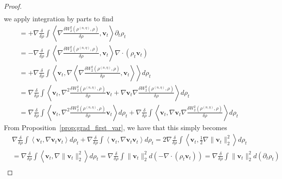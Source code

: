 \documentclass[reqno,11pt,letterpaper]{amsart}
\theoremstyle{plain}
\theoremstyle{definition}
\theoremstyle{remark}
\begin{document}
\begin{proof}
\begin{align*}
\end{align*}
we apply integration by parts to find
\begin{align*}
    &= +\nabla\frac{\delta}{\delta\rho} \int \left\langle \nabla\frac{\delta W_{2}^{2}(\rho^{(n,\eta)}, \rho) }{\delta \rho}, \mathbf{v}_{t} \right\rangle \partial_{t} \rho_{t} \\
    &= -\nabla\frac{\delta}{\delta\rho} \int \left\langle \nabla\frac{\delta W_{2}^{2}(\rho^{(n,\eta)}, \rho) }{\delta \rho}, \mathbf{v}_{t} \right\rangle \nabla \cdot (\rho_{t} \mathbf{v}_{t} )
    \\
    &= + \nabla\frac{\delta}{\delta\rho} \int \left\langle \mathbf{v}_{t}, \nabla\left\langle \nabla\frac{\delta W_{2}^{2}(\rho^{(n,\eta)}, \rho) }{\delta \rho}, \mathbf{v}_{t} \right\rangle \right\rangle d\rho_{t} \\
    &= \nabla\frac{\delta}{\delta\rho} \int \left\langle \mathbf{v}_{t}, \nabla^{2}\frac{\delta W_{2}^{2}(\rho^{(n,\eta)}, \rho) }{\delta \rho} \mathbf{v}_{t} + \nabla \mathbf{v}_{t} \nabla \frac{\delta W_{2}^{2}(\rho^{(n,\eta)}, \rho) }{\delta \rho} \right\rangle  d\rho_{t} \\
    &= \nabla\frac{\delta}{\delta\rho} \int \left\langle \mathbf{v}_{t}, \nabla^{2}\frac{\delta W_{2}^{2}(\rho^{(n,\eta)}, \rho) }{\delta \rho} \mathbf{v}_{t}  \right\rangle  d\rho_{t} + \nabla\frac{\delta}{\delta\rho} \int \left\langle \mathbf{v}_{t},  \nabla \mathbf{v}_{t} \nabla \frac{\delta W_{2}^{2}(\rho^{(n,\eta)}, \rho) }{\delta \rho} \right\rangle  d\rho_{t} 
    \end{align*}
    From Proposition~\ref{prop:grad_first_var}, we have that this simply becomes
    \begin{align*}
        &\nabla\frac{\delta}{\delta\rho} \int \left\langle \mathbf{v}_{t}, \nabla\mathbf{v}_{t} \mathbf{v}_{t}  \right\rangle  d\rho_{t} + \nabla\frac{\delta}{\delta\rho} \int \left\langle \mathbf{v}_{t},  \nabla \mathbf{v}_{t} \mathbf{v}_{t} \right\rangle  d\rho_{t} = 2 \nabla\frac{\delta}{\delta\rho} \int \left\langle \mathbf{v}_{t}, \frac{1}{2}\nabla \lVert \mathbf{v}_{t} \rVert_{2}^{2} \right\rangle  d\rho_{t} \\
        &=  \nabla\frac{\delta}{\delta\rho} \int \left\langle \mathbf{v}_{t}, \nabla \lVert \mathbf{v}_{t} \rVert_{2}^{2} \right\rangle  d\rho_{t}  =\nabla\frac{\delta}{\delta\rho} \int \lVert \mathbf{v}_{t} \rVert_{2}^{2}  d \left(- \nabla \cdot (\rho_{t} \mathbf{v}_{t} ) \right) = \nabla\frac{\delta}{\delta\rho} \int \lVert \mathbf{v}_{t} \rVert_{2}^{2}  d (\partial_{t} \rho_{t}) \\

\end{align*}
\end{proof}
\end{document}
